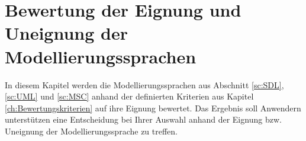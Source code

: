 

\chapter{Bewertung der Eignung und Uneignung der Modellierungssprachen}
\label{ch:Eignung}
In diesem Kapitel werden die Modellierungssprachen aus Abschnitt \ref{sc:SDL}, \ref{sc:UML} und \ref{sc:MSC} anhand der definierten Kriterien aus Kapitel \ref{ch:Bewertungskriterien} auf ihre Eignung bewertet. Das Ergebnis soll Anwendern unterstützen eine Entscheidung bei Ihrer Auswahl anhand der Eignung bzw. Uneignung der Modellierungssprache zu treffen.









